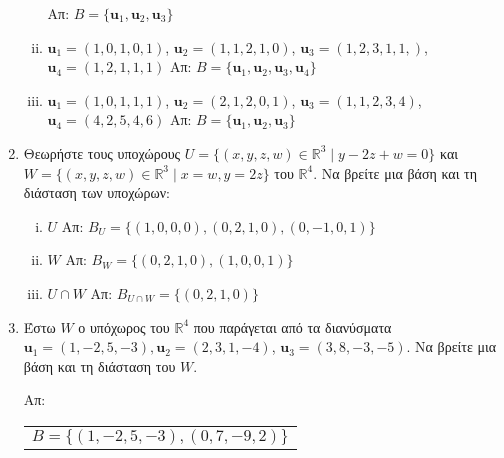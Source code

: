 \begin{enumerate}
\begin{enumerate}[(i)]
        \hfill Απ: $ B = \{ \mathbf{u}_{1}, \mathbf{u}_{2}, \mathbf{u}_{3} \} $ 

      \item $ \mathbf{u}_{1} = (1,0,1,0,1) $, $ \mathbf{u}_{2} = (1,1,2,1,0) $, 
        $ \mathbf{u} _{3} = (1,2,3,1,1,) $, $ \mathbf{u}_{4} = (1,2,1,1,1) $
        \hfill Απ: $ B = \{ \mathbf{u}_{1}, \mathbf{u}_{2}, \mathbf{u}_{3}, 
        \mathbf{u}_{4} \} $ 

      \item $ \mathbf{u}_{1} = (1,0,1,1,1) $, $ \mathbf{u}_{2} = (2,1,2,0,1) $, 
        $ \mathbf{u} _{3} = (1,1,2,3,4) $, $ \mathbf{u}_{4} = (4,2,5,4,6) $
        \hfill Απ: $ B = \{ \mathbf{u}_{1}, \mathbf{u}_{2}, \mathbf{u}_{3} \} $ 
    \end{enumerate}

  \item Θεωρήστε τους υποχώρους 
    $ U = \{ (x,y,z,w) \in \mathbb{R}^{3} \mid y - 2z + w = 0 \} $ και 
    $ W = \{ (x,y,z,w) \in \mathbb{R}^{3} \mid x = w, y = 2z \} $ του 
    $\mathbb{R}^{4}$. Να βρείτε μια βάση και τη διάσταση των υποχώρων:
    \begin{enumerate}[(i)]
      \item $ U $ \hfill Απ: $ B_{U} = \{ (1,0,0,0), (0,2,1,0), (0,-1,0,1) \} $ 
      \item $ W $ \hfill Απ: $ B_{W} = \{ (0,2,1,0), (1,0,0,1) \} $ 
      \item $ U \cap W $ \hfill Απ: $ B_{U\cap W} = \{ (0,2,1,0) \} $ 
    \end{enumerate}	

  \item Έστω $ W $ ο υπόχωρος του $\mathbb{R}^{4}$ που παράγεται από τα διανύσματα 
    $ \mathbf{u} _{1} = (1,-2,5,-3), \mathbf{u}_{2} = (2,3,1,-4) $, 
    $ \mathbf{u}_{3} = (3,8,-3,-5) $.
      Να βρείτε μια βάση και τη διάσταση του $ W $.

    \hfill Απ:  \begin{tabular}{l}
      $B = \{ (1,-2,5,-3), (0,7,-9,2) \}$ \\
    \end{tabular} 
\end{enumerate}




